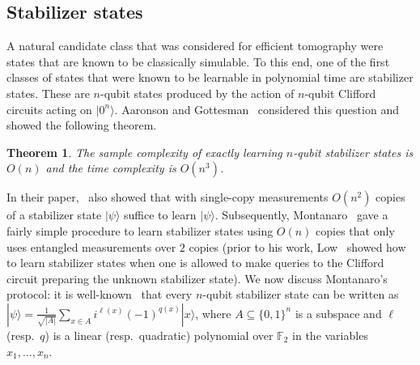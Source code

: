 \documentclass[11pt]{article}
\def\01{\{0,1\}}
\def\01{\{0,1\}}
\newcommand{\ket}[1]{|#1\rangle}
\newcommand{\FF}{\mathbb{F}}
\newtheorem{theorem}{Theorem}
\begin{document}
\subsection{Stabilizer states}
A natural candidate class that was considered for efficient tomography were  states that are known to be classically simulable. To this end, one of the first classes of states that were known to be learnable in polynomial time are stabilizer states. These are $n$-qubit states produced by the action of $n$-qubit Clifford circuits acting on $\ket{0^n}$. Aaronson and Gottesman~\cite{aaronson2004improved,aaronsongottesmantalk} considered this question and showed the following theorem. 
\begin{theorem}
\label{thm:stab}
The sample complexity of exactly learning $n$-qubit stabilizer states is $O(n)$ and the time complexity is $O(n^3)$.
\end{theorem}
In their paper,~\cite{aaronson2004improved} also showed that with single-copy measurements $O(n^2)$ copies of a stabilizer state $\ket{\psi}$ suffice to learn $\ket{\psi}$.  Subsequently, Montanaro~\cite{montanaro2017learning} gave a fairly simple procedure to learn stabilizer states using $O(n)$ copies that only uses entangled measurements over $2$ copies (prior to his work, Low~\cite{low2009learning} showed how to learn stabilizer states when one is allowed to make queries to the Clifford circuit preparing the unknown stabilizer state). We now discuss Montanaro's protocol: it is well-known~\cite{dehaene2003clifford,nest2008classical} that every $n$-qubit stabilizer state can be written as $\ket{\psi}=\frac{1}{\sqrt{|A|}}\sum_{x\in A}i^{\ell(x)}(-1)^{q(x)}\ket{x}$, where $A\subseteq \01^n$ is a subspace and $\ell$ (resp.~$q$) is a linear (resp.~quadratic) polynomial over $\FF_2$ in the variables $x_1,\ldots,x_n$. 
\end{document}
